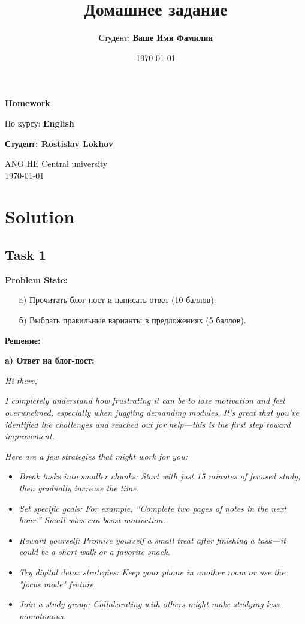 \documentclass[a4paper,12pt]{article}
\title{Домашнее задание}
\author{Студент: \textbf{Ваше Имя Фамилия}}
\date{\today}
\begin{document}
\begin{titlepage}
    \centering
    \vspace*{1cm}

    \Huge
    \textbf{Homework}

    \vspace{0.5cm}
    \LARGE
    По курсу: \textbf{English}

    \vspace{1.5cm}

    \textbf{Студент: Rostislav Lokhov}

    \vfill

    \Large
    ANO HE Central university\\
    \vspace{0.3cm}
    \today

\end{titlepage}

\tableofcontents
\newpage

\section{Solution}

\subsection{Task 1}
\textbf{Problem Stste:}

\begin{itemize}
    \item[a)] Прочитать блог-пост и написать ответ (10 баллов).
    \item[б)] Выбрать правильные варианты в предложениях (5 баллов).
\end{itemize}

\textbf{Решение:}

\textbf{a) Ответ на блог-пост:}

\textit{Hi there,}  

\textit{I completely understand how frustrating it can be to lose motivation and feel overwhelmed, especially when juggling demanding modules. It’s great that you’ve identified the challenges and reached out for help—this is the first step toward improvement.}  

\textit{Here are a few strategies that might work for you:}  
\begin{itemize}
    \item \textit{Break tasks into smaller chunks: Start with just 15 minutes of focused study, then gradually increase the time.}
    \item \textit{Set specific goals: For example, “Complete two pages of notes in the next hour.” Small wins can boost motivation.}
    \item \textit{Reward yourself: Promise yourself a small treat after finishing a task—it could be a short walk or a favorite snack.}
    \item \textit{Try digital detox strategies: Keep your phone in another room or use the "focus mode" feature.}
    \item \textit{Join a study group: Collaborating with others might make studying less monotonous.}
\end{itemize}
\end{document}
